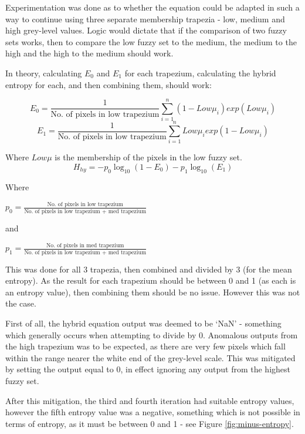 Experimentation was done as to whether the equation could be adapted in such a way to continue using three separate membership trapezia - low, medium and high grey-level values. Logic would dictate that if the comparison of two fuzzy sets works, then to compare the low fuzzy set to the medium, the medium to the high and the high to the medium should work.

In theory, calculating $E_0$ and $E_1$ for each trapezium, calculating the hybrid entropy for each, and then combining them, should work:

\begin{equation}
E_0 = \frac{1}{\text{No. of pixels in low trapezium}}\displaystyle\sum_{i=1}^{n}{(1-Low\mu_i)exp(Low\mu_i)}
\end{equation}
\begin{equation}
E_1 = \frac{1}{\text{No. of pixels in low trapezium}}\displaystyle\sum_{i=1}^{n}{Low\mu_iexp(1-Low\mu_i)}
\end{equation}

Where $Low\mu$ is the membership of the pixels in the low fuzzy set.
\begin{equation}
H_{hy} = -p_0\log_{10}(1 - E_0) - p_1\log_{10}(E_1)
\end{equation}

Where

$p_0 = \frac{\text{No. of pixels in low trapezium}}{\text{No. of pixels in low trapezium + med trapezium}}$

and

$p_1 = \frac{\text{No. of pixels in med trapezium}}{\text{No. of pixels in low trapezium + med trapezium}}$


This was done for all 3 trapezia, then combined and divided by 3 (for the mean entropy). As the result for each trapezium should be between 0 and 1 (as each is an entropy value), then combining them should be no issue. However this was not the case.

First of all, the hybrid equation output was deemed to be `NaN' - something which generally occurs when attempting to divide by 0. Anomalous outputs from the high trapezium was to be expected, as there are very few pixels which fall within the range nearer the white end of the grey-level scale. This was mitigated by setting the output equal to 0, in effect ignoring any output from the highest fuzzy set.

After this mitigation, the third and fourth iteration had suitable entropy values, however the fifth entropy value was a negative, something which is not possible in terms of entropy, as it must be between 0 and 1 - see Figure \ref{fig:minus-entropy}.

